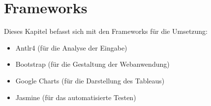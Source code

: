 \chapter{Frameworks}\label{sec:Frameworks}
Dieses Kapitel befasst sich mit den Frameworks für die Umsetzung:
\begin{itemize}
\item Antlr4 (für die Analyse der Eingabe)
\item Bootstrap (für die Gestaltung der Webanwendung)
\item Google Charts (für die Darstellung des Tableaus) 
\item Jasmine (für das automatisierte Testen)
\end{itemize}

